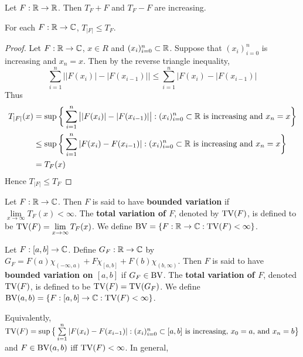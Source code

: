 \documentclass{book}
\begin{document}
	\begin{lem}
		Let $F:\mathbb{R} \rightarrow \mathbb{R}$. Then $T_F+F$ and $T_F-F$ are increasing.
	\end{lem}
	
	\begin{ex}  
		For each $F:\mathbb{R} \rightarrow \mathbb{C}$, $T_{|F|} \leq T_F$.
	\end{ex}
	
	\begin{proof}
		Let $F:\mathbb{R} \rightarrow \mathbb{C}$, $x \in R$ and $(x_i)_{i=0}^n \subset \mathbb{R}$. Suppose that $(x_i)_{i=0}^n$ is increasing and $x_n=x$. Then by the reverse triangle inequality, $$ \sum\limits_{i=1}^n\big||F(x_i)|-|F(x_{i-1})|\big|
		\leq \sum\limits_{i=1}^n\big|F(x_i)-|F(x_{i-1})\big|$$
		Thus 
		\begin{align*}
			T_{|F|}(x) 
			&= \sup\bigg \{\sum\limits_{i=1}^{n}\big||F(x_{i})| - |F(x_{i-1})|\big|: (x_i)_{i=0}^n \subset \mathbb{R} \text{ is increasing and } x_n=x  \bigg \} \\
			& \leq \sup\bigg \{\sum\limits_{i=1}^{n}|F(x_{i}) - F(x_{i-1})|: (x_i)_{i=0}^n \subset \mathbb{R} \text{ is increasing and } x_n=x  \bigg \} \\
			&= T_F(x)
		\end{align*}
		Hence $T_{|F|} \leq T_F$
	\end{proof}
	
	\begin{defn}  
		Let $F:\mathbb{R} \rightarrow \mathbb{C}$. Then $F$ is said to have \textbf{bounded variation} if $\lim \limits_{x \rightarrow \infty}T_F(x)<\infty$. The \textbf{total variation of $F$}, denoted by $\text{TV}(F)$, is defined to be $\text{TV}(F) = \lim\limits_{x\rightarrow \infty}T_F(x)$.
		We define $\text{BV} = \{F:\mathbb{R} \rightarrow \mathbb{C}: \text{TV}(F)<\infty \}$.
	\end{defn}
	
	\begin{defn}  
		Let $F:[a,b] \rightarrow \mathbb{C}$. Define $G_F:\mathbb{R} \rightarrow \mathbb{C}$ by $G_F = F(a)\chi_{(-\infty,a)} + F\chi_{[a,b]}+F(b)\chi_{(b,\infty)}$. Then $F$ is said to have \textbf{bounded variation on $[a,b]$} if $G_F \in \text{BV}$. The \textbf{total variation of $F$}, denoted $\text{TV}(F)$, is defined to be $\text{TV}(F) = \text{TV}(G_F)$. We define $\text{BV}(a,b) = \{F:[a,b] \rightarrow \mathbb{C}: \text{TV}(F) < \infty\}$.
	\end{defn}
	
	\begin{note}
		Equivalently, $\text{TV}(F) = \sup \big \{\sum\limits_{i=1}^{n}|F(x_{i}) - F(x_{i-1})|: (x_i)_{i=0}^n \subset [a,b] \text{ is increasing, } x_0=a \text{, and } x_n=b\big \}$ and $F \in \text{BV}(a,b)$ iff $\text{TV}(F) < \infty$. In general, 
	\end{note}
	
\end{document}
